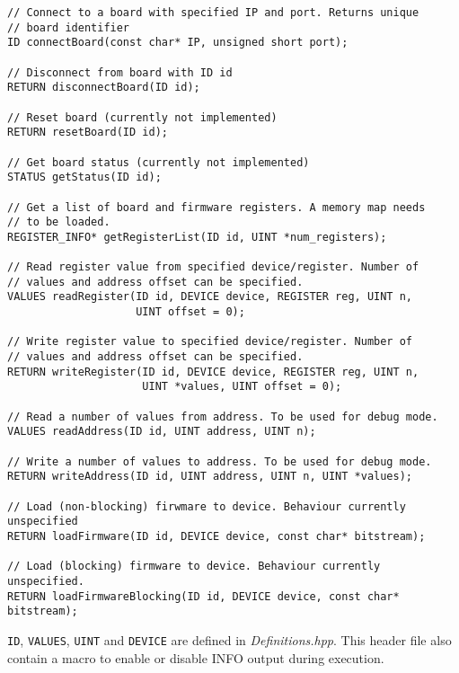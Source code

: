 \documentclass[a4paper,11pt]{article}
\begin{document}
\begin{lstlisting}[caption=TPM Access Layer API listing]
// Connect to a board with specified IP and port. Returns unique
// board identifier
ID connectBoard(const char* IP, unsigned short port);

// Disconnect from board with ID id
RETURN disconnectBoard(ID id);

// Reset board (currently not implemented)
RETURN resetBoard(ID id);

// Get board status (currently not implemented)
STATUS getStatus(ID id);

// Get a list of board and firmware registers. A memory map needs 
// to be loaded.
REGISTER_INFO* getRegisterList(ID id, UINT *num_registers);

// Read register value from specified device/register. Number of 
// values and address offset can be specified.
VALUES readRegister(ID id, DEVICE device, REGISTER reg, UINT n, 
                    UINT offset = 0);

// Write register value to specified device/register. Number of 
// values and address offset can be specified.
RETURN writeRegister(ID id, DEVICE device, REGISTER reg, UINT n, 
                     UINT *values, UINT offset = 0);

// Read a number of values from address. To be used for debug mode. 
VALUES readAddress(ID id, UINT address, UINT n);

// Write a number of values to address. To be used for debug mode. 
RETURN writeAddress(ID id, UINT address, UINT n, UINT *values);

// Load (non-blocking) firwmare to device. Behaviour currently unspecified
RETURN loadFirmware(ID id, DEVICE device, const char* bitstream);

// Load (blocking) firmware to device. Behaviour currently unspecified.
RETURN loadFirmwareBlocking(ID id, DEVICE device, const char* bitstream);
\end{lstlisting}

\texttt{ID}, %
\texttt{VALUES}, \texttt{UINT} and \texttt{DEVICE} are defined in {\it 
Definitions.hpp}. This header file also contain a macro to enable or disable 
INFO output during execution.
\end{document}
